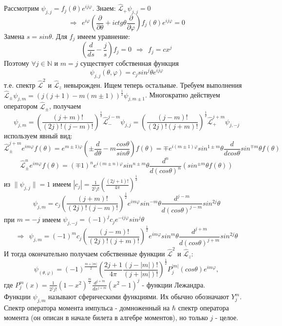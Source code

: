 	Рассмотрим $\psi_{j,j} = f_j(\theta)e^{ij\varphi}$. Знаем: $\hat{\mathcal{L}}_{+}\psi_{j,j} = 0$
	$$
		\Rightarrow \ \ e^{i\varphi}\left(\frac{\partial}{\partial\theta} + ictg\theta\frac{\partial}{\partial\varphi}\right)f_j(\theta)e^{ij\varphi} = 0
	$$
	Замена $s = sin\theta$. Для $f_j$ имеем уравнение:
	$$
		\left(\frac{d}{ds}-\frac{j}{s}\right)f_j = 0 \ \ \Rightarrow \ \ f_j = cx^j
	$$
	Поэтому $\forall j \in\mathbb{N}$ и $m = j$ существует собственная функция 
	$$
		\psi_{j,j} (\theta,\varphi) = c_j sin^j\theta e^{ij\varphi}
	$$
	т.е. спектр $\hat{\mathcal{L}}^2$ и $\hat{\mathcal{L}}_z$ невырожден. Ищем теперь остальные. Требуем выполнения $\hat{\mathcal{L}}_{\pm}\psi_{j,m} = (j(j + 1)-m(m\pm1))^{\frac{1}{2}}\psi_{j,m\pm1}$. Многократно действуем оператором $\hat{\mathcal{L}}_{\pm}$, получаем 
	$$
		\psi_{j,m} = \left(\frac{(j + m)!}{(2j)!(j-m)!}\right)^{\frac{1}{2}}\hat{\mathcal{L}}^{j-m}_{-}\psi_{j,j} = \left(\frac{(j - m)!}{(2j)!(j+m)!}\right)^{\frac{1}{2}}\hat{\mathcal{L}}^{j+m}_{+}\psi_{j,-j}
	$$
	используем явный вид:
	$$
		\hat{\mathcal{L}}^{j+m}_{\pm}e^{im\varphi}f(\theta) = e^{m\pm1)\varphi}\left(\pm\frac{d}{d\theta}-m\frac{cos\theta}{sin\theta}\right)f(\theta) = \mp e^{i(m\pm1)\varphi}sin^{1\pm m}\theta \frac{d}{dcos\theta}sin^{\mp m}\theta f(\theta)
	$$
	$$
		\hat{\mathcal{L}}^{n}_{\pm} e^{im\varphi}f(\theta)=(\mp1)^ne^{i(m\pm n)\varphi}sin^{n\pm m}\theta \frac{d^n}{d(cos\theta)^n}(sin^{\pm m}\theta f(\theta))
	$$
	из $\|\psi_{j,j}\|=1$ имеем $|c_j| = \frac{1}{2^jj!}\left(\frac{(2j+1)!}{4\pi}\right)^{\frac{1}{2}}$
	$$
		\psi_{j,m} = c_j\left(\frac{(j + m)!}{(2j)!(j-m)!}\right)^{\frac{1}{2}}e^{im\varphi}sin^{-m}\theta\frac{d^{j-m}}{d(cos\theta)^{j-m}}sin^{2j}\theta
	$$
	при $m = -j$ имеем $\psi_{j,-j} = (-1)^jc_je^{-ij\varphi}sin^j\theta$
	$$
		\Rightarrow \ \ \psi_{j,m} = (-1)^mc_j\left(\frac{(j-m)!}{(2j)!(j+m)!}\right)^{\frac{1}{2}}e^{im\varphi}sin^m\theta\frac{d^{j+m}}{d(cos\theta)^{j+m}}sin^{2j}\theta
	$$
	И тогда окончательно получаем собственные функции $\hat{\mathcal{L}}^2$ и $\hat{\mathcal{L}}_z$:
	$$
		\psi_(\theta,\varphi) = (-1)^{\frac{m+|m|}{2}}\left(\frac{2j+1}{4\pi}\frac{(j-|m|)!}{(j+|m|)!}\right)^{\frac{1}{2}}P^{|m|}_j(cos\theta)e^{im\varphi},
	$$
	где $P^m_j(x) = \frac{1}{2^jj!}(1-x^2)^{\frac{m}{2}}\frac{d^{j+m}}{dx^{j+m}}(x^2-1)^j$ - функции Лежандра.\\
	Функции $\psi_{j,m}$ называют сферическими функциями. Их обычно обозначают $Y^m_j$. \\
	Спектр оператора момента импульса - домноженный на $\hbar$ спектр оператора момента (он описан в начале билета в алгебре моментов), но только $j$ - целое.
